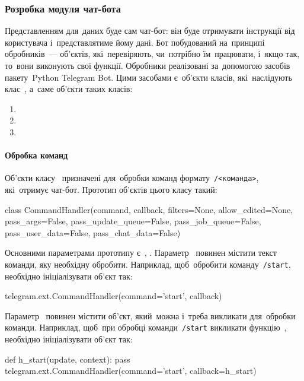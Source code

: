 \documentclass[
	a4paper,
	oneside,
	BCOR = 10mm,
	DIV = 12,
	12pt,
	headings = normal,
]{scrartcl}
\begin{document}
			\subsubsection{Розробка модуля чат-бота}
				Представленням для~даних буде сам чат-бот: він буде отримувати інструкції від користувача і~представлятиме йому дані. Бот побудований на~принципі обробників~— об'єктів, які~перевіряють, чи~потрібно їм~працювати, і~якщо так, то~вони виконують свої функції. Обробники реалізовані за~допомогою засобів пакету~\textenglish{Python Telegram Bot}. Цими засобами є~об'єкти класів, які~наслідують клас~, а~саме об'єкти таких класів:
				\begin{enumerate}
					\item {}
					\item {}
					\item {}
				\end{enumerate}

				\paragraph{Обробка команд}
				Об'єкти класу~ призначені для~обробки команд формату~\verb|/<команда>|, які~отримує чат-бот. Прототип об'єктів цього класу такий:~\cite{ptb-docs-commandhandler}
				\begin{pythoncode}
					class CommandHandler(command, callback, filters=None, allow_edited=None, pass_args=False, pass_update_queue=False, pass_job_queue=False, pass_user_data=False, pass_chat_data=False)
				\end{pythoncode}
				Основними параметрами прототипу є~, . Параметр~ повинен містити текст команди, яку необхідну обробити. Наприклад, щоб~обробити команду~\verb|/start|, необхідно ініціалізувати об'єкт так:
				\begin{pythoncode}
					telegram.ext.CommandHandler(command='start', callback)
				\end{pythoncode}
				Параметр~ повинен містити об'єкт, який~можна і~треба викликати для~обробки команди. Наприклад, щоб~при обробці команди~\verb|/start| викликати функцію~, необхідно ініціалізувати об'єкт так:
				\begin{pythoncode}
					def h_start(update, context):
					    pass
					telegram.ext.CommandHandler(command='start', callback=h_start)
				\end{pythoncode}
\end{document}
